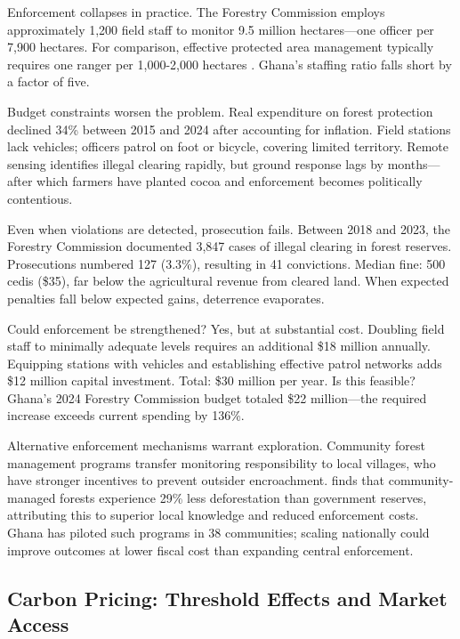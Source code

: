 Enforcement collapses in practice. The Forestry Commission employs approximately 1,200 field staff to monitor 9.5 million hectares—one officer per 7,900 hectares. For comparison, effective protected area management typically requires one ranger per 1,000-2,000 hectares \citep{jachmann2008monitoring}. Ghana's staffing ratio falls short by a factor of five.

Budget constraints worsen the problem. Real expenditure on forest protection declined 34\% between 2015 and 2024 after accounting for inflation. Field stations lack vehicles; officers patrol on foot or bicycle, covering limited territory. Remote sensing identifies illegal clearing rapidly, but ground response lags by months—after which farmers have planted cocoa and enforcement becomes politically contentious.

Even when violations are detected, prosecution fails. Between 2018 and 2023, the Forestry Commission documented 3,847 cases of illegal clearing in forest reserves. Prosecutions numbered 127 (3.3\%), resulting in 41 convictions. Median fine: 500 cedis (\$35), far below the agricultural revenue from cleared land. When expected penalties fall below expected gains, deterrence evaporates.

Could enforcement be strengthened? Yes, but at substantial cost. Doubling field staff to minimally adequate levels requires an additional \$18 million annually. Equipping stations with vehicles and establishing effective patrol networks adds \$12 million capital investment. Total: \$30 million per year. Is this feasible? Ghana's 2024 Forestry Commission budget totaled \$22 million—the required increase exceeds current spending by 136\%.

Alternative enforcement mechanisms warrant exploration. Community forest management programs transfer monitoring responsibility to local villages, who have stronger incentives to prevent outsider encroachment. \citet{bowler2012community} finds that community-managed forests experience 29\% less deforestation than government reserves, attributing this to superior local knowledge and reduced enforcement costs. Ghana has piloted such programs in 38 communities; scaling nationally could improve outcomes at lower fiscal cost than expanding central enforcement.

\subsection{Carbon Pricing: Threshold Effects and Market Access}

